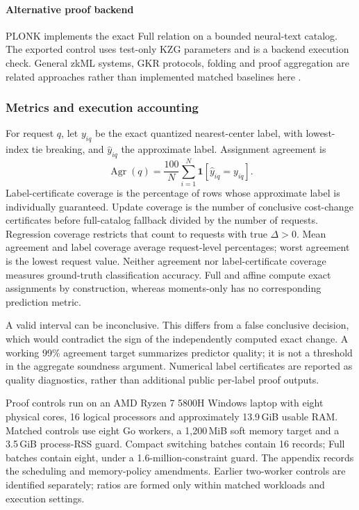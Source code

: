\paragraph{Alternative proof backend}
PLONK implements the exact Full relation on a bounded neural-text catalog.
The exported control uses test-only KZG parameters and is a backend execution
check. General zkML systems, GKR protocols, folding and proof aggregation
are related approaches rather than implemented matched baselines here
\cite{chen2024zkml,thaler2013time,kothapalli2022nova,gailly2022snarkpack}.

\subsubsection{Metrics and execution accounting}
For request $q$, let $y_{iq}$ be the exact quantized nearest-center label,
with lowest-index tie breaking, and $\widehat y_{iq}$ the approximate label.
Assignment agreement is
\begin{equation}\label{eq:evaluation-agreement}
 \operatorname{Agr}(q)=\frac{100}{N}\sum_{i=1}^{N}
       \mathbf1[\widehat y_{iq}=y_{iq}].
\end{equation}
Label-certificate coverage is the percentage of rows whose approximate
label is individually guaranteed. Update coverage is the number of
conclusive cost-change certificates before full-catalog fallback divided
by the number of requests. Regression coverage restricts that count to
requests with true $\Delta>0$. Mean agreement and label coverage average
request-level percentages; worst agreement is the lowest request value.
Neither agreement nor label-certificate coverage measures ground-truth
classification accuracy. Full and affine compute exact assignments by
construction, whereas moments-only has no corresponding prediction metric.

A valid interval can be inconclusive. This differs from a false conclusive
decision, which would contradict the sign of the independently computed
exact change. A working 99\% agreement target summarizes predictor quality;
it is not a threshold in the aggregate soundness argument. Numerical label
certificates are reported as quality diagnostics, rather than additional
public per-label proof outputs.

Proof controls run on an AMD Ryzen 7 5800H Windows laptop with eight physical
cores, 16 logical processors and approximately 13.9\,GiB usable RAM. Matched
controls use eight Go workers, a 1,200\,MiB soft memory target and a
3.5\,GiB process-RSS guard. Compact switching batches contain 16 records;
Full batches contain eight, under a 1.6-million-constraint guard. The
appendix records the scheduling and memory-policy amendments. Earlier
two-worker controls are identified separately; ratios are formed only
within matched workloads and execution settings.

